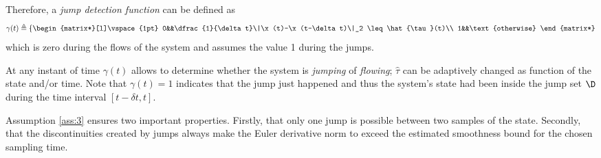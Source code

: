 %
Therefore, a \textit{jump detection function} can be defined as
%
\begin{equation}
    \gamma(t)\triangleq \left\{ 
        \begin{matrix*}[l]\vspace{1pt}
            0&&\dfrac{1}{\delta t}\|\x(t)-\x(t-\delta t)\|_2 \leq \hat{\tau}(t)\\
            1&&\text{otherwise}
        \end{matrix*}
    \right.
\end{equation}
%	
which is zero during the flows of the system and assumes the value 1 during the jumps.

At any instant of time $\gamma(t)$ allows to determine whether the system is \textit{jumping} of \textit{flowing};
 $\hat{\tau}$ can be adaptively changed as function of the state and/or time.
Note that $\gamma(t)=1$ indicates that the jump just happened and thus the system's state had been inside the jump set $\D$ during the time interval $[t-\delta t,t]$.
%
\begin{rem}
    Assumption \ref{ass:3} ensures two important properties. Firstly, that only one jump is possible between two samples of the state. Secondly, that the discontinuities created by jumps always make the Euler derivative norm to exceed the estimated smoothness bound for the chosen sampling time. 
\end{rem}
%
\clearpage
